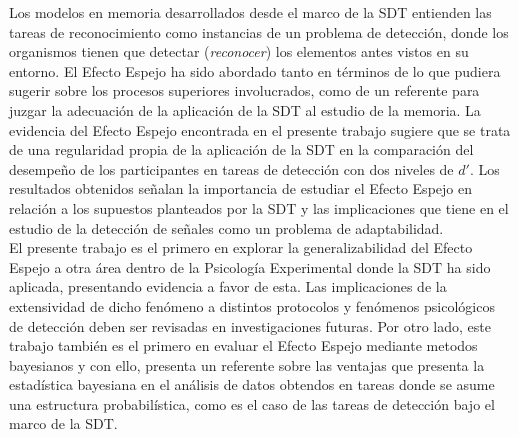 Los modelos en memoria desarrollados desde el marco de la SDT entienden las tareas de reconocimiento como instancias de un problema de detección, donde los organismos tienen que detectar (\textit{reconocer}) los elementos antes vistos en su entorno. El Efecto Espejo ha sido abordado tanto en términos de lo que pudiera sugerir sobre los procesos superiores involucrados, como de un referente para juzgar la adecuación de la aplicación de la SDT al estudio de la memoria. La evidencia del Efecto Espejo encontrada en el presente trabajo sugiere que se trata de una regularidad propia de la aplicación de la SDT en la comparación del desempeño de los participantes en tareas de detección con dos niveles de $d'$. Los resultados obtenidos señalan la importancia de estudiar el Efecto Espejo en relación a los supuestos planteados por la SDT y las implicaciones que tiene en el estudio de la detección de señales como un problema de adaptabilidad.\\

El presente trabajo es el primero en explorar la generalizabilidad del Efecto Espejo a otra área dentro de la Psicología Experimental donde la SDT ha sido aplicada, presentando evidencia a favor de esta. Las implicaciones de la extensividad de dicho fenómeno a distintos protocolos y fenómenos psicológicos de detección deben ser revisadas en investigaciones futuras. Por otro lado, este trabajo también es el primero en evaluar el Efecto Espejo mediante metodos bayesianos y con ello, presenta un referente sobre las ventajas que presenta la estadística bayesiana en el análisis de datos obtendos en tareas donde se asume una estructura probabilística, como es el caso de las tareas de detección bajo el marco de la SDT.\\









